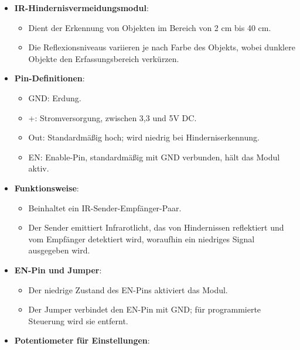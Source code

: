 \documentclass{vorlage-design-main}
\begin{document}
\begin{itemize}

\item
  \textbf{IR-Hindernisvermeidungsmodul}:

  \begin{itemize}
  
  \item
    Dient der Erkennung von Objekten im Bereich von 2 cm bis 40 cm.
  \item
    Die Reflexionsniveaus variieren je nach Farbe des Objekts, wobei
    dunklere Objekte den Erfassungsbereich verkürzen.
  \end{itemize}
\item
  \textbf{Pin-Definitionen}:

  \begin{itemize}
  
  \item
    GND: Erdung.
  \item
    +: Stromversorgung, zwischen 3,3 und 5V DC.
  \item
    Out: Standardmäßig hoch; wird niedrig bei Hinderniserkennung.
  \item
    EN: Enable-Pin, standardmäßig mit GND verbunden, hält das Modul
    aktiv.
  \end{itemize}
\item
  \textbf{Funktionsweise}:

  \begin{itemize}
  
  \item
    Beinhaltet ein IR-Sender-Empfänger-Paar.
  \item
    Der Sender emittiert Infrarotlicht, das von Hindernissen reflektiert
    und vom Empfänger detektiert wird, woraufhin ein niedriges Signal
    ausgegeben wird.
  \end{itemize}
\item
  \textbf{EN-Pin und Jumper}:

  \begin{itemize}
  
  \item
    Der niedrige Zustand des EN-Pins aktiviert das Modul.
  \item
    Der Jumper verbindet den EN-Pin mit GND; für programmierte Steuerung
    wird sie entfernt.
  \end{itemize}
\item
  \textbf{Potentiometer für Einstellungen}:

  \begin{itemize}
  

\end{itemize}
\end{itemize}
\end{document}

